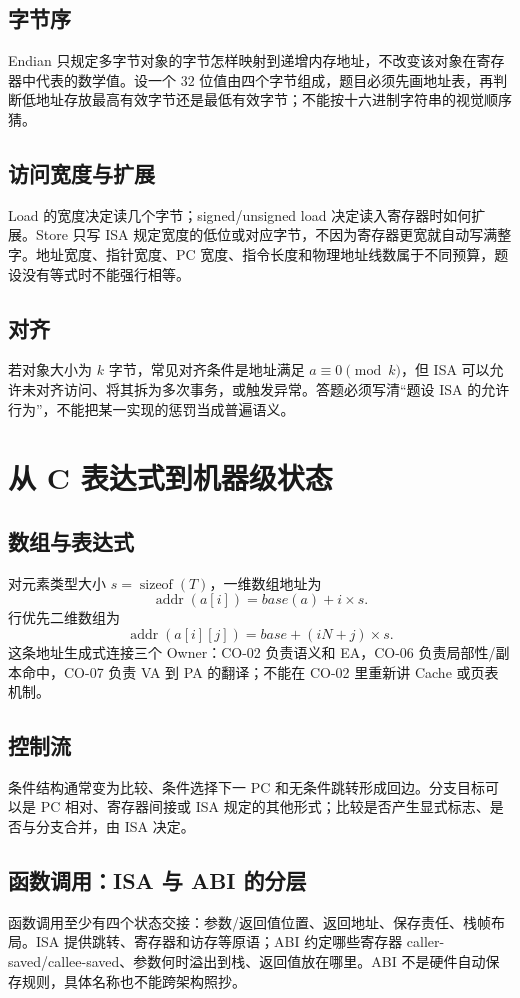 \documentclass[UTF8,fontset=fandol,11pt,a4paper]{ctexart}
\begin{document}
\subsection{字节序}
Endian 只规定多字节对象的字节怎样映射到递增内存地址，不改变该对象在寄存器中代表的数学值。设一个 $32$ 位值由四个字节组成，题目必须先画地址表，再判断低地址存放最高有效字节还是最低有效字节；不能按十六进制字符串的视觉顺序猜。

\subsection{访问宽度与扩展}
Load 的宽度决定读几个字节；signed/unsigned load 决定读入寄存器时如何扩展。Store 只写 ISA 规定宽度的低位或对应字节，不因为寄存器更宽就自动写满整字。地址宽度、指针宽度、PC 宽度、指令长度和物理地址线数属于不同预算，题设没有等式时不能强行相等。

\subsection{对齐}
若对象大小为 $k$ 字节，常见对齐条件是地址满足 $a\equiv0\pmod{k}$，但 ISA 可以允许未对齐访问、将其拆为多次事务，或触发异常。答题必须写清“题设 ISA 的允许行为”，不能把某一实现的惩罚当成普遍语义。

\section{从 C 表达式到机器级状态}

\subsection{数组与表达式}
对元素类型大小 $s=\operatorname{sizeof}(T)$，一维数组地址为
\[
\operatorname{addr}(a[i])=base(a)+i\times s.
\]
行优先二维数组为
\[
\operatorname{addr}(a[i][j])=base+(iN+j)\times s.
\]
这条地址生成式连接三个 Owner：CO-02 负责语义和 EA，CO-06 负责局部性/副本命中，CO-07 负责 VA 到 PA 的翻译；不能在 CO-02 里重新讲 Cache 或页表机制。

\subsection{控制流}
条件结构通常变为比较、条件选择下一 PC 和无条件跳转形成回边。分支目标可以是 PC 相对、寄存器间接或 ISA 规定的其他形式；比较是否产生显式标志、是否与分支合并，由 ISA 决定。

\subsection{函数调用：ISA 与 ABI 的分层}
函数调用至少有四个状态交接：参数/返回值位置、返回地址、保存责任、栈帧布局。ISA 提供跳转、寄存器和访存等原语；ABI 约定哪些寄存器 caller-saved/callee-saved、参数何时溢出到栈、返回值放在哪里。ABI 不是硬件自动保存规则，具体名称也不能跨架构照抄。
\end{document}
